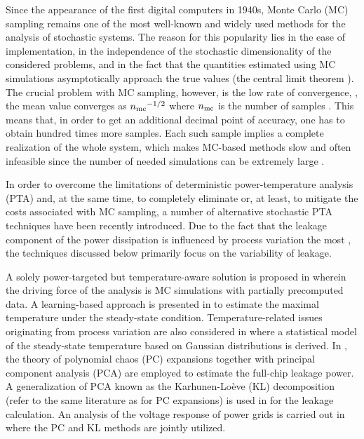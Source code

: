 Since the appearance of the first digital computers in 1940s, Monte Carlo (MC) sampling remains one of the most well-known and widely used methods for the analysis of stochastic systems.
The reason for this popularity lies in the ease of implementation, in the independence of the stochastic dimensionality of the considered problems, and in the fact that the quantities estimated using MC simulations asymptotically approach the true values (the central limit theorem \cite{durrett2010}).
The crucial problem with MC sampling, however, is the low rate of convergence, \eg, the mean value converges as ${n_\text{mc}}^{-1/2}$ where ${n_\text{mc}}$ is the number of samples \cite{xiu2010, maitre2010}.
This means that, in order to get an additional decimal point of accuracy, one has to obtain hundred times more samples.
Each such sample implies a complete realization of the whole system, which makes MC-based methods slow and often infeasible since the number of needed simulations can be extremely large \cite{diaz-emparanza2002}.

In order to overcome the limitations of deterministic power-temperature analysis (PTA) and, at the same time, to completely eliminate or, at least, to mitigate the costs associated with MC sampling, a number of alternative stochastic PTA techniques have been recently introduced.
Due to the fact that the leakage component of the power dissipation is influenced by process variation the most \cite{chandrakasan2001, srivastava2010, juan2011, juan2012}, the techniques discussed below primarily focus on the variability of leakage.

A solely power-targeted but temperature-aware solution is proposed in \cite{chandra2010} wherein the driving force of the analysis is MC simulations with partially precomputed data.
A learning-based approach is presented in \cite{juan2011} to estimate the maximal temperature under the steady-state condition.
Temperature-related issues originating from process variation are also considered in \cite{juan2012} where a statistical model of the steady-state temperature based on Gaussian distributions is derived.
In \cite{shen2009}, the theory of polynomial chaos (PC) expansions \cite{xiu2010, maitre2010, ghanem1991, eldred2008} together with principal component analysis (PCA) are employed to estimate the full-chip leakage power.
A generalization of PCA known as the Karhunen-Lo\`{e}ve (KL) decomposition (refer to the same literature as for PC expansions) is used in \cite{bhardwaj2006} for the leakage calculation.
An analysis of the voltage response of power grids is carried out in \cite{ghanta2006} where the PC and KL methods are jointly utilized.

